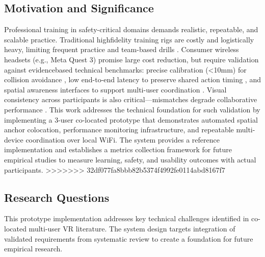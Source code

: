 \subsection{Motivation and Significance}

Professional training in safety-critical domains demands realistic, repeatable, and scalable practice. Traditional highfidelity training rigs are costly and logistically heavy, limiting frequent practice and team-based drills \cite{SharmaSharad2025IASR}. Consumer wireless headsets (e.g., Meta Quest 3) promise large cost reduction, but require validation against evidencebased technical benchmarks: precise calibration (\textless10mm) for collision avoidance \cite{ReimerDennis2021CfSV}, low end-to-end latency to preserve shared action timing \cite{VanDammeSam2024Iolo}, and spatial awareness interfaces to support multi-user coordination \cite{ChenLei2024Eoep}. Visual consistency across participants is also critical—mismatches degrade collaborative performance \cite{WeissYannick2025ItEo}. This work addresses the technical foundation for such validation by implementing a 3-user co-located prototype that demonstrates automated spatial anchor colocation, performance monitoring infrastructure, and repeatable multi-device coordination over local WiFi. The system provides a reference implementation and establishes a metrics collection framework for future empirical studies to measure learning, safety, and usability outcomes with actual participants.
>>>>>>> 32df077fa8bbb82b5374f4992fe0114abd8167f7

\subsection{Research Questions}
This prototype implementation addresses key technical challenges identified in co-located multi-user VR literature. The system design targets integration of validated requirements from systematic review to create a foundation for future empirical research.

